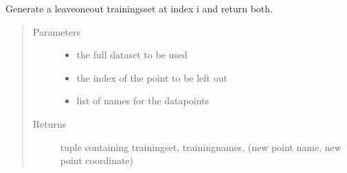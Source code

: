 \documentclass[letterpaper,10pt,english]{sphinxmanual}
\begin{document}
\begin{fulllineitems}
\label{\detokenize{classification:classification.generateTrainingset}}
\sphinxAtStartPar
Generate a leave\sphinxhyphen{}one\sphinxhyphen{}out trainingsset at index i and return both.
\begin{quote}\begin{description}
\item[{Parameters}] \leavevmode\begin{itemize}
\item {} 
\sphinxAtStartPar
{} \textendash{} the full dataset to be used

\item {} 
\sphinxAtStartPar
{} \textendash{} the index of the point to be left out

\item {} 
\sphinxAtStartPar
{} \textendash{} list of names for the datapoints

\end{itemize}

\item[{Returns}] \leavevmode
\sphinxAtStartPar
tuple containing trainingset, trainingnames, (new point name, new point coordinate)

\end{description}\end{quote}

\end{fulllineitems}

\end{document}
